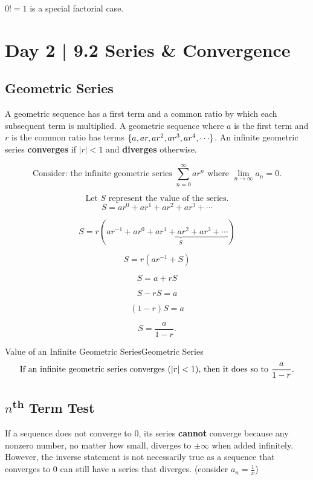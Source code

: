 \documentclass{article}
\theoremstyle{definition}
\DeclarePairedDelimiter{\abs}{\lvert}{\rvert}
\DeclarePairedDelimiter{\curly}{\{}{\}}
\begin{document}
\begin{center}
    $0!=1$ is a special factorial case.
\end{center}



\section{Day 2 | 9.2 Series \& Convergence}

\subsection{Geometric Series}
A geometric sequence has a first term and a common ratio by which each subsequent term is multiplied. A geometric sequence where $a$ is the first term and $r$ is the common ratio has terms $\curly{a, ar, ar^2, ar^3, ar^4, \cdots}$.
An infinite geometric series \textbf{converges} if $\lvert r \rvert <1$ and \textbf{diverges} otherwise.


\[\text{Consider: the infinite geometric series } \sum_{n=0}^{\infty} ar^n \text{ where } \lim_{n \to \infty} a_n=0.\]

\[\text{Let $S$ represent the value of the series.}\]
\[S=ar^0+ar^1+ar^2+ar^3+\cdots\]

\[S=r(ar^{-1}+\underbrace{ar^0+ar^1+ar^2+ar^3+\cdots}_ {S})\] 

\[S=r(ar^{-1}+S)\]

\[S=a+rS\]

\[S-rS=a\]

\[(1-r)S=a\]

\[S=\frac{a}{1-r}.\]

\begin{theorem}{Value of an Infinite Geometric Series}{Geometric Series}
\vspace{-0.3cm}
    \[\text{If an infinite geometric series converges ($\abs{r}<1$), then it does so to } \frac{a}{1-r}.\]
\end{theorem}

\subsection{$n$\textsuperscript{th} Term Test}
If a sequence does not converge to 0, its series \textbf{cannot} converge because any nonzero number, no matter how small, diverges to $\pm \infty$ when added infinitely. However, the inverse statement is not necessarily true as a sequence that converges to 0 can still have a series that diverges. (consider $a_n=\frac{1}{x}$)
\end{document}
